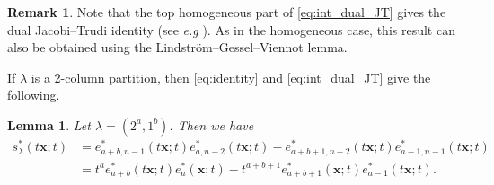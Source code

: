 \documentclass[12pt]{amsart}
\newtheorem{lem}[thm]{Lemma}
\theoremstyle{definition}
\newtheorem{remark}[thm]{Remark}
\newcommand{\bfx}{\boldsymbol{x}}
\def\LW#1{(\textcolor{teal}{LW:#1})}
\def\HBD#1{(\textcolor{violet}{HBD:#1})}
\begin{document}
\begin{appendices}
\begin{remark}
    Note that the top homogeneous part of \cref{eq:int_dual_JT} gives the dual Jacobi–Trudi identity (see \textit{e.g} \cite[Corollary 7.16.2]{Stanley:EC2}). As in the homogeneous case, this result can also be obtained using the Lindström–Gessel–Viennot lemma.
\end{remark}

If $\lambda$
is a 2-column partition, then \cref{eq:identity} and \cref{eq:int_dual_JT} give the following.
\begin{lem}\label{lem:2column}
Let $\lambda=(2^a,1^b)$.  Then we have 
\begin{align*}
s^*_{\lambda}(t\bfx;t)&=e^*_{a+b,n-1}(t\bfx;t)e^*_{a,n-2}(t\bfx;t)-e^*_{a+b+1,n-2}(t\bfx;t)e^*_{a-1,n-1}(t\bfx;t)\\
&=t^a e^*_{a+b}(t\bfx;t) e^*_a(\bfx;t) - t^{a+b+1} e^*_{a+b+1}(\bfx;t) e^*_{a-1}(t\bfx;t).
\end{align*}
\end{lem}
\end{appendices}


\fi



   
\end{document}
